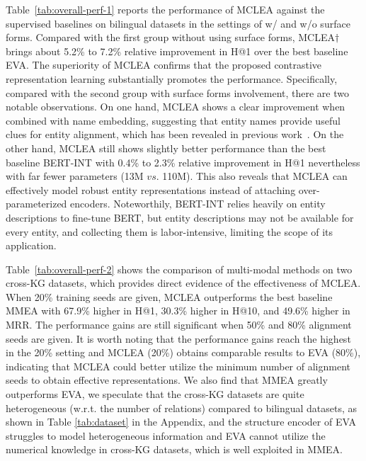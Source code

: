 \documentclass[11pt]{article}
\begin{document}
Table~\ref{tab:overall-perf-1} reports the performance of MCLEA against the supervised baselines on bilingual datasets in the settings of w/ and w/o surface forms.
Compared with the first group without using surface forms, MCLEA$\dagger$ brings about 5.2\% to 7.2\% relative improvement in H@1 over the best baseline EVA.
The superiority of MCLEA confirms that the proposed contrastive representation learning substantially promotes the performance.
Specifically, compared with the second group with surface forms involvement, there are two notable observations.
On one hand, MCLEA shows a clear improvement when combined with name embedding, suggesting that entity names provide useful clues for entity alignment, which has been revealed in previous work~\cite{zhang2019multi,liu2020exploring, ge2021make}.
On the other hand, MCLEA still shows slightly better performance than the best baseline BERT-INT with 0.4\% to 2.3\% relative improvement in H@1 nevertheless with far fewer parameters (13M $vs.$ 110M).
This also reveals that MCLEA can effectively model robust entity representations instead of attaching over-parameterized encoders.
Noteworthily, BERT-INT relies heavily on entity descriptions to fine-tune BERT, but entity descriptions may not be available for every entity, and collecting them is labor-intensive, limiting the scope of its application.

Table~\ref{tab:overall-perf-2} shows the comparison of multi-modal methods on two cross-KG datasets, which provides direct evidence of the effectiveness of MCLEA.
When 20\% training seeds are given, MCLEA outperforms the best baseline MMEA with 67.9\% higher in H@1, 30.3\% higher in H@10, and 49.6\% higher in MRR.
The performance gains are still significant when 50\% and 80\% alignment seeds are given.
It is worth noting that the performance gains reach the highest in the 20\% setting and MCLEA (20\%) obtains comparable results to EVA (80\%), indicating that MCLEA could better utilize the minimum number of alignment seeds to obtain effective representations.
We also find that MMEA greatly outperforms EVA, we speculate that the cross-KG datasets are quite heterogeneous (w.r.t. the number of relations) compared to bilingual datasets, as shown in Table \ref{tab:dataset} in the Appendix, and the structure encoder of EVA struggles to model heterogeneous information and EVA cannot utilize the numerical knowledge in cross-KG datasets, which is well exploited in MMEA.
\end{document}
